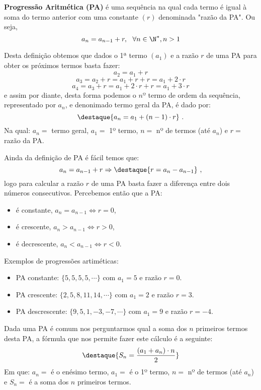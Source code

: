  \colorbox{azul}{
 \begin{minipage}{14.5cm}
 \begin{center}
  \textbf{Progressão Aritmética (PA)} é uma sequência na qual cada termo é igual à soma do termo anterior com uma constante $(r)$ denominada "razão da PA". Ou seja,
  \[a_{n}= a_{n-1} + r, \ \ \forall n \in \N^{\ast}, n > 1\]
 \end{center}
 \end{minipage}}
 \vskip0.3cm
 
 Desta definição obtemos que dados o 1ª termo $(a_1)$ e a razão $r$ de uma PA para obter os próximos termos basta fazer:
 \[a_2= a_1 + r\]
 \[a_3= a_2 + r= a_1 + r + r= a_1 + 2 \cdot r\]
 \[a_4= a_3 + r= a_1 + 2 \cdot r + r= a_1 + 3 \cdot r\]
 e assim por diante, desta forma podemos o $nº$ termo de ordem da sequência, representado por $a_n$, e denonimado termo geral da PA, é dado por:
 \[\destaque{a_n= a_1 + (n-1) \cdot r} \ .\]
 Na qual: $a_n=$ termo geral, $a_1=$ 1º termo, $n=$ nº de termos (até $a_n$) e $r=$ razão da PA.
 
 Ainda da definição de PA é fácil temos que:
 \[a_{n}= a_{n-1} + r \Rightarrow 
 \destaque{r= a_{n} - a_{n-1}} \ ,\]
 logo para calcular a razão $r$ de uma PA basta fazer a diferença entre dois números consecutivos. Percebemos então que a PA:
 \begin{itemize}
  \item é constante, $a_n= a_{n-1} \Leftrightarrow r= 0$, 
  \item é crescente, $a_n > a_{n-1} \Leftrightarrow r > 0$,
  \item é decrescente, $a_n < a_{n-1} \Leftrightarrow r < 0$.
 \end{itemize}
 
 \begin{exem} Exemplos de progressões artiméticas:
  \begin{itemize}
   \item PA constante: $\{5, 5, 5, 5, \cdots\}$ com $a_1= 5$ e razão $r= 0$.
   \item PA crescente: $\{2, 5, 8, 11, 14, \cdots\}$ com $a_1= 2$ e razão $r= 3$.
   \item PA descrescente: $\{9, 5, 1, -3, -7, \cdots\}$ com $a_1= 9$ e razão $r= -4$.
  \end{itemize}
 \end{exem}
 
 Dada uma PA é comum nos perguntarmos qual a soma dos $n$ primeiros termos desta PA, a fórmula que nos permite fazer este cálculo é a seguinte:
 \[\destaque{S_n= \frac{(a_1 + a_n)\cdot n}{2}}\]
 Em que: $a_n=$ é o enésimo termo, $a_1=$ é o 1º termo, $n=$ nº de termos (até $a_n$) e $S_n=$ é a soma dos $n$ primeiros termos.

